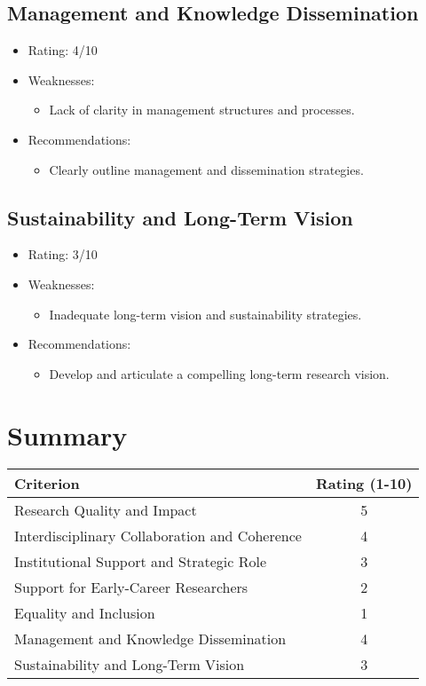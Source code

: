\documentclass{article}
\begin{document}
\subsection{Management and Knowledge Dissemination}
\begin{itemize}
    \item Rating: 4/10
    \item Weaknesses:
        \begin{itemize}
            \item Lack of clarity in management structures and processes.
        \end{itemize}
    \item Recommendations:
        \begin{itemize}
            \item Clearly outline management and dissemination strategies.
        \end{itemize}
\end{itemize}

\subsection{Sustainability and Long-Term Vision}
\begin{itemize}
    \item Rating: 3/10
    \item Weaknesses:
        \begin{itemize}
            \item Inadequate long-term vision and sustainability strategies.
        \end{itemize}
    \item Recommendations:
        \begin{itemize}
            \item Develop and articulate a compelling long-term research vision.
        \end{itemize}
\end{itemize}

\section{Summary}
\begin{center}
\begin{tabular}{|l|c|}
\hline
Criterion & Rating (1-10) \\
\hline
Research Quality and Impact & 5 \\
Interdisciplinary Collaboration and Coherence & 4 \\
Institutional Support and Strategic Role & 3 \\
Support for Early-Career Researchers & 2 \\
Equality and Inclusion & 1 \\
Management and Knowledge Dissemination & 4 \\
Sustainability and Long-Term Vision & 3 \\
\hline
\end{tabular}
\end{center}
\end{document}
